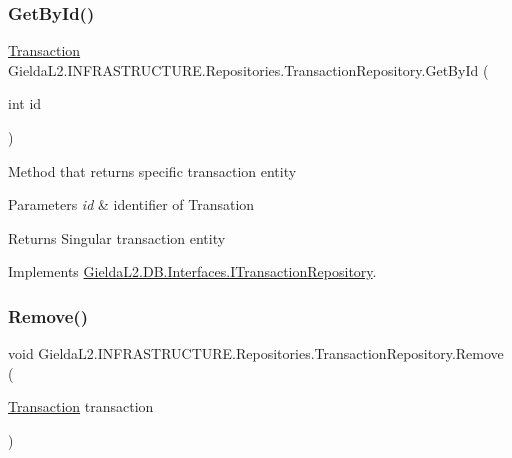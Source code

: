 \subsubsection{\texorpdfstring{GetById()}{GetById()}}
{\footnotesize\ttfamily \mbox{\hyperlink{class_gielda_l2_1_1_d_b_1_1_entities_1_1_transaction}{Transaction}} Gielda\+L2.\+I\+N\+F\+R\+A\+S\+T\+R\+U\+C\+T\+U\+R\+E.\+Repositories.\+Transaction\+Repository.\+Get\+By\+Id (\begin{DoxyParamCaption}\item[{int}]{id }\end{DoxyParamCaption})}



Method that returns specific transaction entity 


\begin{DoxyParams}{Parameters}
{\em id} & identifier of Transation\\
\hline
\end{DoxyParams}
\begin{DoxyReturn}{Returns}
Singular transaction entity
\end{DoxyReturn}


Implements \mbox{\hyperlink{interface_gielda_l2_1_1_d_b_1_1_interfaces_1_1_i_transaction_repository_a40ecc5e312af4137c8fe31276d8dda45}{Gielda\+L2.\+D\+B.\+Interfaces.\+I\+Transaction\+Repository}}.

\mbox{\label{class_gielda_l2_1_1_i_n_f_r_a_s_t_r_u_c_t_u_r_e_1_1_repositories_1_1_transaction_repository_aff0c2a4944edbe498dd4e2ccbc867679}} 
\subsubsection{\texorpdfstring{Remove()}{Remove()}}
{\footnotesize\ttfamily void Gielda\+L2.\+I\+N\+F\+R\+A\+S\+T\+R\+U\+C\+T\+U\+R\+E.\+Repositories.\+Transaction\+Repository.\+Remove (\begin{DoxyParamCaption}\item[{\mbox{\hyperlink{class_gielda_l2_1_1_d_b_1_1_entities_1_1_transaction}{Transaction}}}]{transaction }\end{DoxyParamCaption})}



